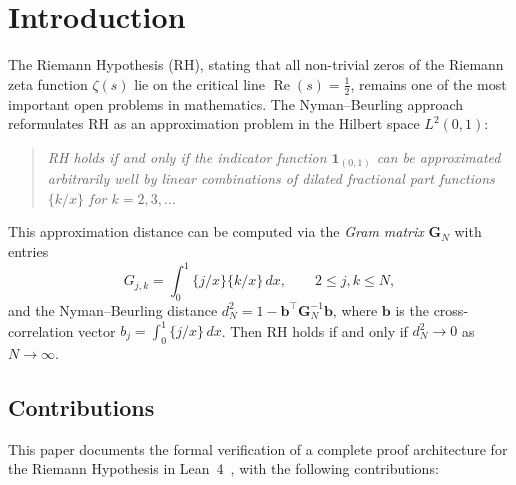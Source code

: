 \documentclass[11pt,a4paper]{article}
\theoremstyle{definition}
\theoremstyle{remark}
\newcommand{\Gram}{\mathbf{G}}
\begin{document}
\tableofcontents

\section{Introduction}\label{sec:intro}

The Riemann Hypothesis (RH), stating that all non-trivial zeros of the
Riemann zeta function $\zeta(s)$ lie on the critical line $\operatorname{Re}(s) = \tfrac{1}{2}$,
remains one of the most important open problems in mathematics.
The Nyman--Beurling approach~\cite{nyman1950,beurling1955,baez-duarte2003}
reformulates RH as an approximation problem in the Hilbert space $L^2(0,1)$:
\begin{quote}
\emph{RH holds if and only if the indicator function $\mathbf{1}_{(0,1)}$
can be approximated arbitrarily well by linear combinations of
dilated fractional part functions $\{k/x\}$ for $k = 2, 3, \ldots$}
\end{quote}

This approximation distance can be computed via the \emph{Gram matrix}
$\Gram_N$ with entries
\[
  G_{j,k} = \int_0^1 \{j/x\}\{k/x\}\,dx, \qquad 2 \leq j,k \leq N,
\]
and the Nyman--Beurling distance $d_N^2 = 1 - \mathbf{b}^\top \Gram_N^{-1} \mathbf{b}$,
where $\mathbf{b}$ is the cross-correlation vector $b_j = \int_0^1 \{j/x\}\,dx$.
Then RH holds if and only if $d_N^2 \to 0$ as $N \to \infty$.

\subsection{Contributions}

This paper documents the formal verification of a complete proof architecture
for the Riemann Hypothesis in Lean~4~\cite{lean4}, with the following
contributions:
\end{document}
